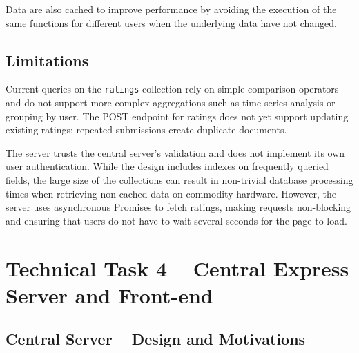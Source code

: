 \documentclass[12pt,a4paper]{article}
\begin{document}
Data are also cached to improve performance by avoiding the execution of the same functions for different users when the underlying data have not changed.

\subsection{Limitations}

Current queries on the \texttt{ratings} collection rely on simple comparison operators and do not support more complex aggregations such as time-series analysis or grouping by user. The POST endpoint for ratings does not yet support updating existing ratings; repeated submissions create duplicate documents.

The server trusts the central server's validation and does not implement its own user authentication. While the design includes indexes on frequently queried fields, the large size of the collections can result in non-trivial database processing times when retrieving non-cached data on commodity hardware. However, the server uses asynchronous Promises to fetch ratings, making requests non-blocking and ensuring that users do not have to wait several seconds for the page to load.

\section{Technical Task 4 -- Central Express Server and Front-end}

\subsection{Central Server -- Design and Motivations}
\end{document}
